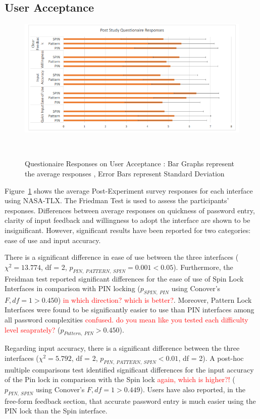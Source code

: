 \documentclass{sigchi}
\newcommand{\comment}[1]{\textcolor{red}{#1}}
\begin{document}
\subsection{User Acceptance}
\begin{figure}[b]
	\centering
	\includegraphics[width=1\columnwidth]{figures/Responses.png}
	\caption{Questionaire Responses on User Acceptance : Bar Graphs represent the average responses , Error Bars represent Standard Deviation}~\label{fig:Responses}
\end{figure}
 Figure~\ref{fig:Responses} shows the average Post-Experiment survey responses for each interface using NASA-TLX.  The Friedman Test is used to assess the participants' responses. Differences between average responses on quickness of password entry, clarity of input feedback and willingness to adopt the interface are shown to be insignificant. However, significant results have been reported for two categories: ease of use and input accuracy.

There is a significant difference in ease of use between the three interfaces ($\chi^{2} = 13.774$, df = 2, $p_{PIN,\:PATTERN, \:SPIN} = 0.001 < 0.05$).  Furthermore, the Freidman test reported significant differences for the ease of use of Spin Lock  Interfaces in comparison with PIN locking   ($p_{SPIN,\:PIN}$ using Conover's $F, df = 1 >  0.450$) \comment{in which direction? which is better?}.  Moreover, Pattern Lock Interfaces were found to be significantly easier to use than PIN interfaces among all password complexities \comment{confused. do you mean like you tested each difficulty level seaprately?} ($p_{Pattern,\:PIN} > 0.450$). 

Regarding input accuracy, there is a significant difference between the three interfaces ($\chi^{2} = 5.792$, df = 2, $p_{PIN,\:PATTERN, \:SPIN} < 0.01$, df = 2). A post-hoc multiple comparisons test identified significant differences for the input accuracy of the Pin lock in comparison with the Spin lock \comment{again, which is higher?!} ($p_{PIN,\:SPIN}$ using Conover's $F, df = 1 >  0.449$).  Users have also reported, in the free-form feedback section, that accurate password entry is much easier using the PIN lock than the Spin interface.
\end{document}
